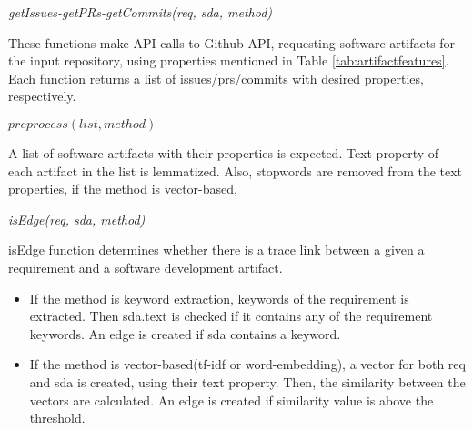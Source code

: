 \emph{getIssues-getPRs-getCommits(req, sda, method)}

These functions make API calls to Github API, requesting software artifacts for the input repository, using properties mentioned in Table \ref{tab:artifactfeatures}. Each function returns a list of issues/prs/commits with desired properties, respectively.



\textbf{$preprocess(list, method)$}

A list of software artifacts with their properties is expected. Text property of each artifact in the list is lemmatized. 
Also, stopwords are removed from the text properties, if the method is vector-based, 


\emph{isEdge(req, sda, method)}

isEdge function determines whether there is a trace link between a given a requirement and a software development artifact.
\begin{itemize}
    \item If the method is keyword extraction, keywords of the requirement is extracted. Then sda.text is checked if it contains any of the requirement keywords. An edge is created if sda contains a keyword.
    \item If the method is vector-based(tf-idf or word-embedding), a vector for both req and sda is created, using their text property. Then, the similarity between the vectors are calculated. An edge is created if similarity value is above the threshold.
\end{itemize}


